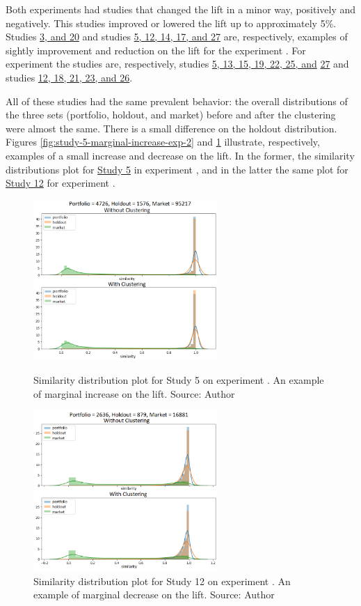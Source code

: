 Both experiments had studies that changed the lift in a minor way, positively and negatively. This studies improved or lowered the lift up to approximately 5\%. Studies \underline{3, and 20} and studies \underline{5, 12, 14, 17, and 27} are, respectively, examples of sightly improvement and reduction on the lift for the experiment \nameExperimentI{}. For experiment \nameExperimentII{} the studies are, respectively, studies \underline{5, 13, 15, 19, 22, 25, and}
\underline{27} and studies \underline{12, 18, 21, 23, and 26}.

All of these studies had the same prevalent behavior: the overall distributions of the three sets (portfolio, holdout, and market) before and after the clustering were almost the same. There is a small difference on the holdout distribution. Figures \ref{fig:study-5-marginal-increase-exp-2} and \ref{fig:study-12-marginal-decrease-exp-1} illustrate, respectively, examples of a small increase and decrease on the lift. In the former, the similarity distributions plot for \underline{Study 5} in experiment \nameExperimentII{}, and in the latter the same plot for \underline{Study 12} for experiment \nameExperimentI{}.

\begin{figure}[h]
   \centering
   \includegraphics[width=7cm]{fig/ch4-study-5-marginal-increase-exp-2.png}
   \caption{Similarity distribution plot for Study 5 on experiment \nameExperimentII{}. An example of marginal increase on the lift. Source: Author}
   \label{fig:study-5-marginal-increase-exp-2}

   \includegraphics[width=7cm]{fig/ch4-study-12-marginal-decrease-exp-1.png}
   \caption{Similarity distribution plot for Study 12 on experiment \nameExperimentI{}. An example of marginal decrease on the lift. Source: Author}
   \label{fig:study-12-marginal-decrease-exp-1}
\end{figure}

